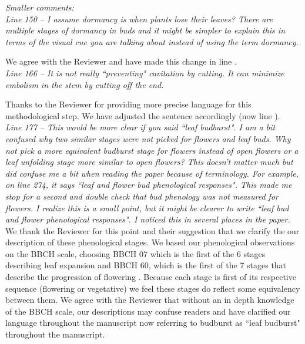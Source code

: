 \documentclass[11pt]{article}
\begin{document}
\emph{Smaller comments:}\\

\emph{Line 150 – I assume dormancy is when plants lose their leaves? There are multiple stages of dormancy in buds and it might be simpler to explain this in terms of the visual cue you are talking about instead of using the term dormancy.}

\noindent We agree with the Reviewer and have made this change in line .\\

\emph{Line 166 – It is not really ``preventing" cavitation by cutting. It can minimize embolism in the stem by cutting off the end.}

\noindent Thanks to the Reviewer for providing more precise language for this methodological step. We have adjusted the sentence accordingly (now line ).\\


\emph{Line  177 – This would be more clear if you said ``leaf budburst". I am a bit confused why two similar stages were not picked for flowers and leaf buds. Why not pick a more equivalent budburst stage for flowers instead of open flowers or a leaf unfolding stage more similar to open flowers? This doesn’t matter much but did confuse me a bit when reading the paper because of terminology. For example, on line 274, it says ``leaf and flower bud phenological responses". This made me stop for a second and double check that bud phenology was not measured for flowers. I realize this is a small point, but it might be clearer to write ``leaf bud and flower phenological responses". I noticed this in several places in the paper.}\\

\noindent We thank the Reviewer for this point and their suggestion that we clarify the our description of these phenological stages. We based our phenological observations on the BBCH scale, choosing BBCH 07 which is the first of the 6 stages describing leaf expansion and BBCH 60, which is the first of the 7 stages that describe the progression of flowering \citep{Finn2007}. Because each stage is first of its respective sequence (flowering or vegetative) we feel these stages do reflect some equivalency between them. %
We agree with the Reviewer that without an in depth knowledge of the BBCH scale, our descriptions may confuse readers and have clarified our language throughout the manuscript now referring to budburst as ``leaf budburst" throughout the manuscript.\\
\end{document}
